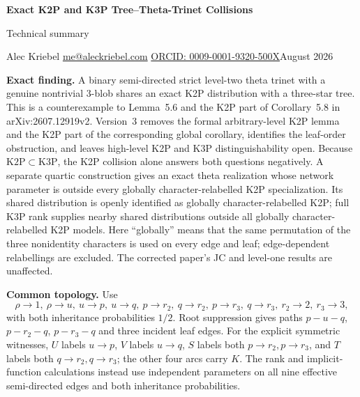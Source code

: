 \documentclass[10pt]{article}
\begin{document}
\begin{center}
{\Large\bfseries Exact K2P and K3P Tree--Theta-Trinet Collisions}\par
{\large Technical summary}\par
Alec Kriebel \quad \href{mailto:me@aleckriebel.com}{me@aleckriebel.com} \quad \href{https://orcid.org/0009-0001-9320-500X}{ORCID: 0009-0001-9320-500X}\hfill August 2026
\end{center}
\textbf{Exact finding.} A binary semi-directed strict level-two theta trinet with a genuine nontrivial $3$-blob shares an exact K2P distribution with a three-star tree. This is a counterexample to Lemma~5.6 and the K2P part of Corollary~5.8 in arXiv:2607.12919v2. Version~3 removes the formal arbitrary-level K2P lemma and the K2P part of the corresponding global corollary, identifies the leaf-order obstruction, and leaves high-level K2P and K3P distinguishability open. Because $\mathrm{K2P}\subset\mathrm{K3P}$, the K2P collision alone answers both questions negatively. A separate quartic construction gives an exact theta realization whose network parameter is outside every globally character-relabelled K2P specialization. Its shared distribution is openly identified as globally character-relabelled K2P; full K3P rank supplies nearby shared distributions outside all globally character-relabelled K2P models. Here ``globally'' means that the same permutation of the three nonidentity characters is used on every edge and leaf; edge-dependent relabellings are excluded. The corrected paper's JC and level-one results are unaffected.

\textbf{Common topology.} Use
\[
\rho\to1,\ \rho\to u,\ u\to p,\ u\to q,\ p\to r_2,\ q\to r_2,\ p\to r_3,\ q\to r_3,\ r_2\to2,\ r_3\to3,
\]
with both inheritance probabilities $1/2$. Root suppression gives paths $p-u-q$, $p-r_2-q$, $p-r_3-q$ and three incident leaf edges.
For the explicit symmetric witnesses, $U$ labels $u\to p$, $V$ labels $u\to q$, $S$ labels both $p\to r_2,p\to r_3$, and $T$ labels both $q\to r_2,q\to r_3$; the other four arcs carry $K$. The rank and implicit-function calculations instead use independent parameters on all nine effective semi-directed edges and both inheritance probabilities.
\end{document}
